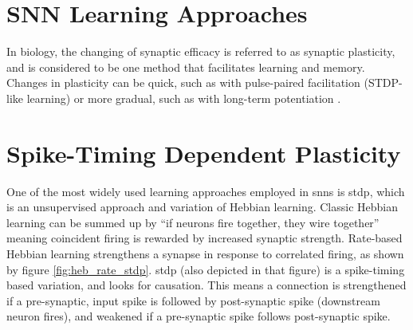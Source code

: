     
    \section{SNN Learning Approaches}
    In biology, the changing of synaptic efficacy is referred to as synaptic
    plasticity, and is considered to be one method that facilitates learning and
    memory. Changes in plasticity can be quick, such as with pulse-paired
    facilitation (STDP-like learning) or more gradual, such as with long-term
    potentiation \parencite{ponulak_2011}.


    \section{Spike-Timing Dependent Plasticity}
    One of the most widely used learning approaches employed in \Glspl{snn} is
    \Gls{stdp}, which is an unsupervised approach and variation of Hebbian
    learning. Classic Hebbian learning can be summed up by ``if neurons fire
    together, they wire together'' meaning coincident firing is rewarded by
    increased synaptic strength. Rate-based Hebbian learning strengthens a
    synapse in response to correlated firing, as shown by figure
    \ref{fig:heb_rate_stdp}. \Gls{stdp} (also depicted in that figure) is a
    spike-timing based variation, and looks for causation. This means a
    connection is strengthened if a pre-synaptic, input spike is followed by
    post-synaptic spike (downstream neuron fires), and weakened if a
    pre-synaptic spike follows post-synaptic spike.


